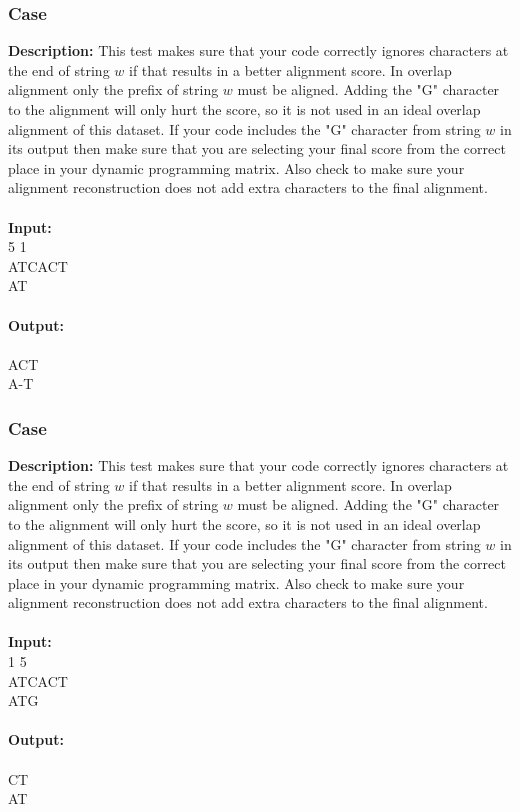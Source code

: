 \documentclass{article}
\newcommand{\code}[1]{{\fontfamily{pcr}\selectfont #1}}
\begin{document}
\subsubsection*{Case }
\hline \vspace{5}
\textbf{Description:} This test makes sure that your code correctly ignores characters at the end of string $w$ if that results in a better alignment score. In overlap alignment only the prefix of string $w$ must be aligned. Adding the "G" character to the alignment will only hurt the score, so it is not used in an ideal overlap alignment of this dataset. If your code includes the "G" character from string $w$ in its output then make sure that you are selecting your final score from the correct place in your dynamic programming matrix. Also check to make sure your alignment reconstruction does not add extra characters to the final alignment.\\ \\
\noindent \textbf{Input:}\\
\code{1 5 1\\ATCACT\\AT}\\ \\
\noindent \textbf{Output:}\\
\code{1\\ACT\\A-T}
\pagebreak

\subsubsection*{Case }
\hline \vspace{5}
\textbf{Description:} This test makes sure that your code correctly ignores characters at the end of string $w$ if that results in a better alignment score. In overlap alignment only the prefix of string $w$ must be aligned. Adding the "G" character to the alignment will only hurt the score, so it is not used in an ideal overlap alignment of this dataset. If your code includes the "G" character from string $w$ in its output then make sure that you are selecting your final score from the correct place in your dynamic programming matrix. Also check to make sure your alignment reconstruction does not add extra characters to the final alignment.\\ \\
\noindent \textbf{Input:}\\
\code{1 1 5\\ATCACT\\ATG}\\ \\
\noindent \textbf{Output:}\\
\code{0\\CT\\AT}
\end{document}

